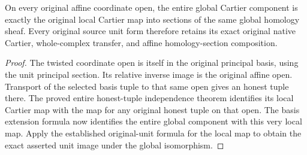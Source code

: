 \begin{theorem}
\label{thm:cartier-geometric-global-original-chart-formula}
\leanok
On every original affine coordinate open, the entire global
Cartier component is exactly the original local Cartier map into
sections of the same global homology sheaf. Every original source
unit form therefore retains its exact original native Cartier,
whole-complex transfer, and affine homology-section composition.
\end{theorem}
\begin{proof}
The twisted coordinate open is itself in the original principal
basis, using the unit principal section. Its relative inverse
image is the original affine open. Transport of the selected
basis tuple to that same open gives an honest tuple there. The
proved entire honest-tuple independence theorem identifies its
local Cartier map with the map for any original honest tuple on
that open. The basis extension formula now identifies the entire
global component with this very local map. Apply the established
original-unit formula for the local map to obtain the exact
asserted unit image under the global isomorphism.
\end{proof}
